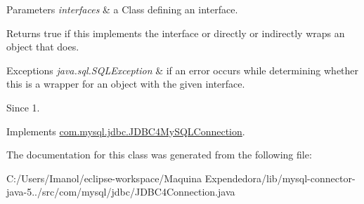 \begin{DoxyParams}{Parameters}
{\em interfaces} & a Class defining an interface. \\
\hline
\end{DoxyParams}
\begin{DoxyReturn}{Returns}
true if this implements the interface or directly or indirectly wraps an object that does. 
\end{DoxyReturn}

\begin{DoxyExceptions}{Exceptions}
{\em java.\+sql.\+S\+Q\+L\+Exception} & if an error occurs while determining whether this is a wrapper for an object with the given interface. \\
\hline
\end{DoxyExceptions}
\begin{DoxySince}{Since}
1. 
\end{DoxySince}


Implements \mbox{\hyperlink{interfacecom_1_1mysql_1_1jdbc_1_1_j_d_b_c4_my_s_q_l_connection}{com.\+mysql.\+jdbc.\+J\+D\+B\+C4\+My\+S\+Q\+L\+Connection}}.



The documentation for this class was generated from the following file\+:\begin{DoxyCompactItemize}
\item 
C\+:/\+Users/\+Imanol/eclipse-\/workspace/\+Maquina Expendedora/lib/mysql-\/connector-\/java-\/5../src/com/mysql/jdbc/J\+D\+B\+C4\+Connection.\+java\end{DoxyCompactItemize}
